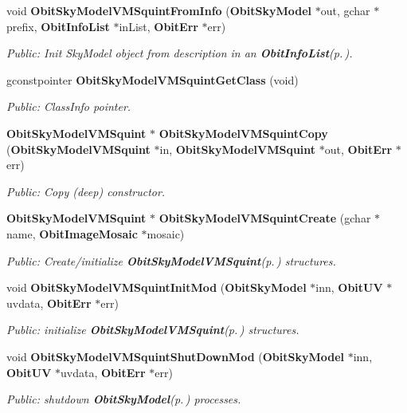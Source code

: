 \begin{CompactItemize}
void {\bf Obit\-Sky\-Model\-VMSquint\-From\-Info} ({\bf Obit\-Sky\-Model} $\ast$out, gchar $\ast$prefix, {\bf Obit\-Info\-List} $\ast$in\-List, {\bf Obit\-Err} $\ast$err)
\begin{CompactList}\small\item\em Public: Init Sky\-Model object from description in an {\bf Obit\-Info\-List}{\rm (p.\,\pageref{structObitInfoList})}. \item\end{CompactList}\item 
gconstpointer {\bf Obit\-Sky\-Model\-VMSquint\-Get\-Class} (void)
\begin{CompactList}\small\item\em Public: Class\-Info pointer. \item\end{CompactList}\item 
{\bf Obit\-Sky\-Model\-VMSquint} $\ast$ {\bf Obit\-Sky\-Model\-VMSquint\-Copy} ({\bf Obit\-Sky\-Model\-VMSquint} $\ast$in, {\bf Obit\-Sky\-Model\-VMSquint} $\ast$out, {\bf Obit\-Err} $\ast$err)
\begin{CompactList}\small\item\em Public: Copy (deep) constructor. \item\end{CompactList}\item 
{\bf Obit\-Sky\-Model\-VMSquint} $\ast$ {\bf Obit\-Sky\-Model\-VMSquint\-Create} (gchar $\ast$name, {\bf Obit\-Image\-Mosaic} $\ast$mosaic)
\begin{CompactList}\small\item\em Public: Create/initialize {\bf Obit\-Sky\-Model\-VMSquint}{\rm (p.\,\pageref{structObitSkyModelVMSquint})} structures. \item\end{CompactList}\item 
void {\bf Obit\-Sky\-Model\-VMSquint\-Init\-Mod} ({\bf Obit\-Sky\-Model} $\ast$inn, {\bf Obit\-UV} $\ast$uvdata, {\bf Obit\-Err} $\ast$err)
\begin{CompactList}\small\item\em Public: initialize {\bf Obit\-Sky\-Model\-VMSquint}{\rm (p.\,\pageref{structObitSkyModelVMSquint})} structures. \item\end{CompactList}\item 
void {\bf Obit\-Sky\-Model\-VMSquint\-Shut\-Down\-Mod} ({\bf Obit\-Sky\-Model} $\ast$inn, {\bf Obit\-UV} $\ast$uvdata, {\bf Obit\-Err} $\ast$err)
\begin{CompactList}\small\item\em Public: shutdown {\bf Obit\-Sky\-Model}{\rm (p.\,\pageref{structObitSkyModel})} processes. \item\end{CompactList}\item 

\end{CompactItemize}
